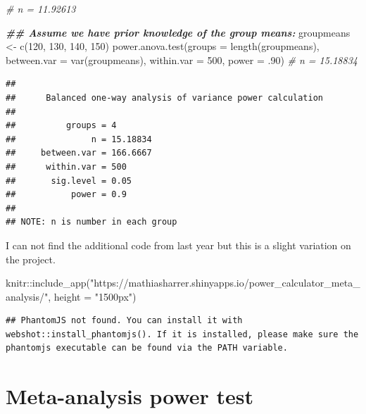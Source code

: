 \documentclass[
]{book}
\newenvironment{Shaded}{\begin{snugshade}}{\end{snugshade}}
\newcommand{\AttributeTok}[1]{\textcolor[rgb]{0.77,0.63,0.00}{#1}}
\newcommand{\CommentTok}[1]{\textcolor[rgb]{0.56,0.35,0.01}{\textit{#1}}}
\newcommand{\DecValTok}[1]{\textcolor[rgb]{0.00,0.00,0.81}{#1}}
\newcommand{\DocumentationTok}[1]{\textcolor[rgb]{0.56,0.35,0.01}{\textbf{\textit{#1}}}}
\newcommand{\FunctionTok}[1]{\textcolor[rgb]{0.00,0.00,0.00}{#1}}
\newcommand{\NormalTok}[1]{#1}
\newcommand{\OtherTok}[1]{\textcolor[rgb]{0.56,0.35,0.01}{#1}}
\newcommand{\SpecialCharTok}[1]{\textcolor[rgb]{0.00,0.00,0.00}{#1}}
\newcommand{\StringTok}[1]{\textcolor[rgb]{0.31,0.60,0.02}{#1}}
\begin{document}
\begin{Shaded}
\begin{Highlighting}[]
\CommentTok{\# n = 11.92613}

\DocumentationTok{\#\# Assume we have prior knowledge of the group means:}
\NormalTok{groupmeans }\OtherTok{\textless{}{-}} \FunctionTok{c}\NormalTok{(}\DecValTok{120}\NormalTok{, }\DecValTok{130}\NormalTok{, }\DecValTok{140}\NormalTok{, }\DecValTok{150}\NormalTok{)}
\FunctionTok{power.anova.test}\NormalTok{(}\AttributeTok{groups =} \FunctionTok{length}\NormalTok{(groupmeans),}
                 \AttributeTok{between.var =} \FunctionTok{var}\NormalTok{(groupmeans),}
                 \AttributeTok{within.var =} \DecValTok{500}\NormalTok{, }\AttributeTok{power =}\NormalTok{ .}\DecValTok{90}\NormalTok{) }\CommentTok{\# n = 15.18834}
\end{Highlighting}
\end{Shaded}

\begin{verbatim}
## 
##      Balanced one-way analysis of variance power calculation 
## 
##          groups = 4
##               n = 15.18834
##     between.var = 166.6667
##      within.var = 500
##       sig.level = 0.05
##           power = 0.9
## 
## NOTE: n is number in each group
\end{verbatim}

I can not find the additional code from last year but this is a slight variation on the project.

\begin{Shaded}
\begin{Highlighting}[]
\NormalTok{knitr}\SpecialCharTok{::}\FunctionTok{include\_app}\NormalTok{(}\StringTok{"https://mathiasharrer.shinyapps.io/power\_calculator\_meta\_analysis/"}\NormalTok{, }\AttributeTok{height =} \StringTok{"1500px"}\NormalTok{) }
\end{Highlighting}
\end{Shaded}

\begin{verbatim}
## PhantomJS not found. You can install it with webshot::install_phantomjs(). If it is installed, please make sure the phantomjs executable can be found via the PATH variable.
\end{verbatim}

\hypertarget{meta-analysis-power-test}{%
\section{Meta-analysis power test}\label{meta-analysis-power-test}}
\end{document}
